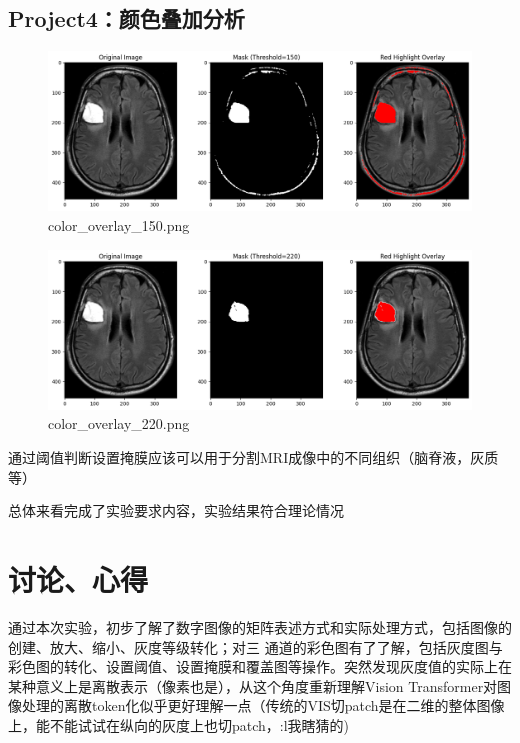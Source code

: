 \documentclass[10.5pt]{config}
\begin{document}
\subsection{Project4：颜色叠加分析}
\begin{figure}[htbp]
    \centering
    \includegraphics[width=1.0\linewidth]{figures/color_overlay_150.png} %
    \caption{color\_overlay\_150.png} %
    \label{fig:color_overlay_150} %
\end{figure}
\begin{figure}[htbp]
    \centering
    \includegraphics[width=1.0\linewidth]{figures/color_overlay_220.png} %
    \caption{color\_overlay\_220.png} %
    \label{fig:color_overlay_220} %
\end{figure}
通过阈值判断设置掩膜应该可以用于分割MRI成像中的不同组织（脑脊液，灰质等）

总体来看完成了实验要求内容，实验结果符合理论情况
\section{讨论、心得}
通过本次实验，初步了解了数字图像的矩阵表述方式和实际处理方式，包括图像的创建、放大、缩小、灰度等级转化；对三
通道的彩色图有了了解，包括灰度图与彩色图的转化、设置阈值、设置掩膜和覆盖图等操作。突然发现灰度值的实际上在某种意义上是离散表示（像素也是），从这个角度重新理解Vision Transformer对图像处理的离散token化似乎更好理解一点（传统的VIS切patch是在二维的整体图像上，能不能试试在纵向的灰度上也切patch，:l我瞎猜的)
\end{document}
